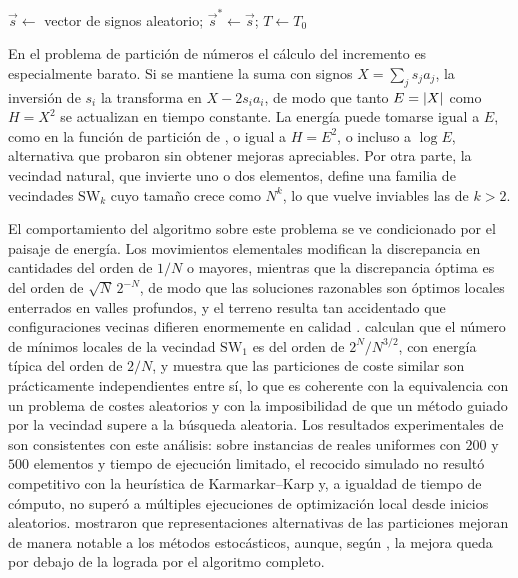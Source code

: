 \begin{algorithm}[H]
\caption{Recocido simulado}\label{alg:sa}
$\vec{s} \leftarrow$ vector de signos aleatorio; \quad $\vec{s}^\ast \leftarrow \vec{s}$; \quad $T \leftarrow T_0$\;
\While{no se cumpla el criterio de parada}{
  \For{$l \leftarrow 1$ \KwTo $L$}{
    elegir $i \in \{1, \ldots, N\}$ uniformemente; \quad $\Delta \leftarrow H(\vec{s}^{(i)}) - H(\vec{s})$\;
    \If{$\Delta \leq 0$ \textbf{o} $u < \me{-\Delta/T}$, con $u$ uniforme en $[0,1)$}{
      $\vec{s} \leftarrow \vec{s}^{(i)}$\;
      \If{$H(\vec{s}) < H(\vec{s}^\ast)$}{$\vec{s}^\ast \leftarrow \vec{s}$\;}
    }
  }
  $T \leftarrow r\,T$\;
}
\;
\end{algorithm}

En el problema de partición de números el cálculo del incremento es especialmente barato. Si se mantiene la suma con signos $X = \sum_j s_j a_j$, la inversión de $s_i$ la transforma en $X - 2 s_i a_i$, de modo que tanto $E = \left\lvert X \right\rvert$ como $H = X^2$ se actualizan en tiempo constante. La energía puede tomarse igual a $E$, como en la función de partición de \textcite{mertens2001}, o igual a $H = E^2$, o incluso a $\log E$, alternativa que \textcite{johnson1991} probaron sin obtener mejoras apreciables. Por otra parte, la vecindad natural, que invierte uno o dos elementos, define una familia de vecindades $\mathrm{SW}_k$ cuyo tamaño crece como $N^k$, lo que vuelve inviables las de $k > 2$.

El comportamiento del algoritmo sobre este problema se ve condicionado por el paisaje de energía. Los movimientos elementales modifican la discrepancia en cantidades del orden de $1/N$ o mayores, mientras que la discrepancia óptima es del orden de $\sqrt{N}\,2^{-N}$, de modo que las soluciones razonables son óptimos locales enterrados en valles profundos, y el terreno resulta tan accidentado que configuraciones vecinas difieren enormemente en calidad \parencite{johnson1991}. \textcite{ferreira1998} calculan que el número de mínimos locales de la vecindad $\mathrm{SW}_1$ es del orden de $2^N/N^{3/2}$, con energía típica del orden de $2/N$, y \textcite{mertens2001} muestra que las particiones de coste similar son prácticamente independientes entre sí, lo que es coherente con la equivalencia con un problema de costes aleatorios y con la imposibilidad de que un método guiado por la vecindad supere a la búsqueda aleatoria. Los resultados experimentales de \textcite{johnson1991} son consistentes con este análisis: sobre instancias de reales uniformes con $200$ y $500$ elementos y tiempo de ejecución limitado, el recocido simulado no resultó competitivo con la heurística de Karmarkar--Karp y, a igualdad de tiempo de cómputo, no superó a múltiples ejecuciones de optimización local desde inicios aleatorios. \textcite{ruml1996} mostraron que representaciones alternativas de las particiones mejoran de manera notable a los métodos estocásticos, aunque, según \textcite{korf1998}, la mejora queda por debajo de la lograda por el algoritmo completo.

